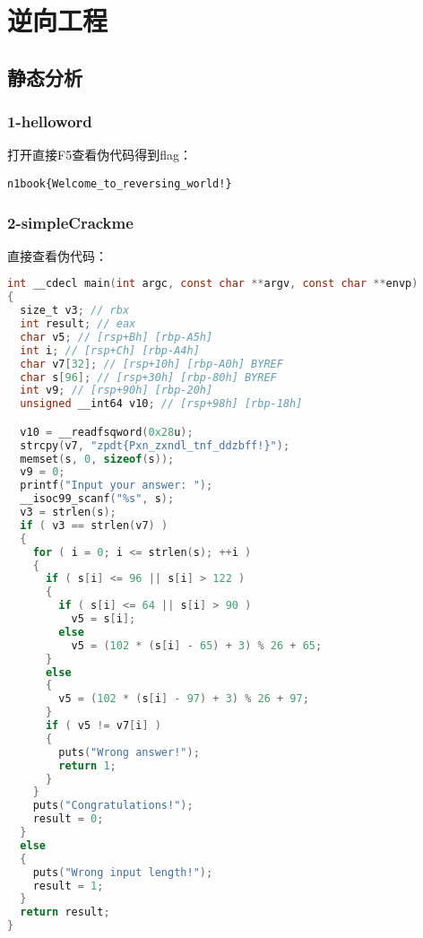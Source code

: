 \chapter{逆向工程}
\section{静态分析}
\subsection{1-helloword}
打开直接F5查看伪代码得到flag：
\begin{lstlisting}
n1book{Welcome_to_reversing_world!}
\end{lstlisting}

\subsection{2-simpleCrackme}
直接查看伪代码：
\begin{lstlisting}[language=C]
int __cdecl main(int argc, const char **argv, const char **envp)
{
  size_t v3; // rbx
  int result; // eax
  char v5; // [rsp+Bh] [rbp-A5h]
  int i; // [rsp+Ch] [rbp-A4h]
  char v7[32]; // [rsp+10h] [rbp-A0h] BYREF
  char s[96]; // [rsp+30h] [rbp-80h] BYREF
  int v9; // [rsp+90h] [rbp-20h]
  unsigned __int64 v10; // [rsp+98h] [rbp-18h]

  v10 = __readfsqword(0x28u);
  strcpy(v7, "zpdt{Pxn_zxndl_tnf_ddzbff!}");
  memset(s, 0, sizeof(s));
  v9 = 0;
  printf("Input your answer: ");
  __isoc99_scanf("%s", s);
  v3 = strlen(s);
  if ( v3 == strlen(v7) )
  {
    for ( i = 0; i <= strlen(s); ++i )
    {
      if ( s[i] <= 96 || s[i] > 122 )
      {
        if ( s[i] <= 64 || s[i] > 90 )
          v5 = s[i];
        else
          v5 = (102 * (s[i] - 65) + 3) % 26 + 65;
      }
      else
      {
        v5 = (102 * (s[i] - 97) + 3) % 26 + 97;
      }
      if ( v5 != v7[i] )
      {
        puts("Wrong answer!");
        return 1;
      }
    }
    puts("Congratulations!");
    result = 0;
  }
  else
  {
    puts("Wrong input length!");
    result = 1;
  }
  return result;
}
\end{lstlisting}

